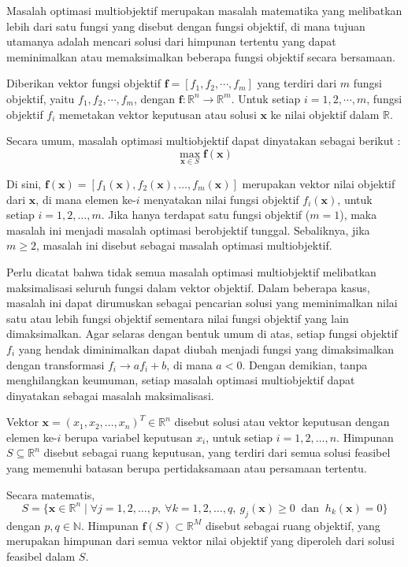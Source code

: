Masalah optimasi multiobjektif merupakan masalah matematika yang melibatkan lebih dari satu fungsi yang disebut dengan fungsi objektif, di mana tujuan utamanya adalah mencari solusi dari himpunan tertentu yang dapat meminimalkan atau memaksimalkan beberapa fungsi objektif secara bersamaan. 

Diberikan vektor fungsi objektif $\mathbf{f} = [f_1 , f_2 , \cdots , f_m]$ yang terdiri dari $m$ fungsi objektif, yaitu $f_1, f_2, \cdots, f_m$, dengan $\mathbf{f}:\mathbb{R}^n \rightarrow \mathbb{R}^m$. Untuk setiap $i = 1,2,\cdots,m$, fungsi objektif $f_i$ memetakan vektor keputusan atau solusi $\mathbf{x}$ ke nilai objektif dalam $\mathbb{R}$.

Secara umum, masalah optimasi multiobjektif dapat dinyatakan sebagai berikut :
\[
\max_{\mathbf{x} \in S} \mathbf{f}(\mathbf{x})
\]

Di sini,  $\mathbf{f}(\mathbf{x}) = [f_1(\mathbf{x}), f_2(\mathbf{x}), \dots,f_m(\mathbf{x})]$ merupakan vektor nilai objektif dari $\mathbf{x}$, di mana elemen ke-$i$ menyatakan nilai fungsi objektif $f_i(\mathbf{x})$, untuk setiap $i = 1, 2, \dots, m$. Jika hanya terdapat satu fungsi objektif ($m=1$), maka masalah ini menjadi masalah optimasi berobjektif tunggal. Sebaliknya, jika $m \geq 2$, masalah ini disebut sebagai masalah optimasi multiobjektif.

Perlu dicatat bahwa tidak semua masalah optimasi multiobjektif melibatkan maksimalisasi seluruh fungsi dalam vektor objektif. Dalam beberapa kasus, masalah ini dapat dirumuskan sebagai pencarian solusi yang meminimalkan nilai satu atau lebih fungsi objektif sementara nilai fungsi objektif yang lain dimaksimalkan. Agar selaras dengan bentuk umum di atas, setiap fungsi objektif $f_i$  yang hendak diminimalkan dapat diubah menjadi fungsi yang dimaksimalkan dengan transformasi $f_i \rightarrow af_i+b$, di mana $a < 0$. Dengan demikian, tanpa menghilangkan keumuman, setiap masalah optimasi multiobjektif dapat dinyatakan sebagai masalah maksimalisasi.

Vektor $\mathbf{x} = (x_1, x_2, \dots, x_n)^T \in \mathbb{R}^n$ disebut solusi atau vektor keputusan dengan elemen ke-$i$ berupa variabel keputusan $x_i$, untuk setiap $i = 1,2,\dots,n$. Himpunan $S \subseteq \mathbb{R}^n$ disebut sebagai ruang keputusan, yang terdiri dari semua solusi feasibel yang memenuhi batasan berupa pertidaksamaan atau persamaan tertentu. 

Secara matematis, 
\[
S = \{\mathbf{x} \in \mathbb{R}^n \mid \forall j = 1, 2, \dots, p,\ \forall k=1,2,\dots,q,\ g_j(\mathbf{x}) \geq 0\ \text{ dan }\ h_k(\mathbf{x})=0\}
\]
dengan $p, q \in \mathbb{N}$. Himpunan $\mathbf{f}(S) \subset \mathbb{R}^M$ disebut sebagai ruang objektif, yang merupakan himpunan dari semua vektor nilai objektif yang diperoleh dari solusi feasibel dalam $S$. 

